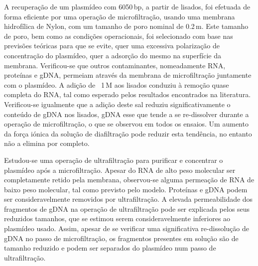 A recuperação de um plasmídeo com 6050\,bp, a partir de lisados, foi efetuada de forma eficiente por uma operação de microfiltração, usando uma membrana hidrofílica de Nylon, com um tamanho de poro nominal de 0.2\,\micro m. Este tamanho de poro, bem como as condições operacionais, foi selecionado com base nas previsões teóricas para que se evite, quer uma excessiva polarização de concentração do plasmídeo, quer a adsorção do mesmo na superfície da membrana. Verificou-se que outros contaminantes, nomeadamente RNA, proteínas e gDNA, permeiam através da membrana de microfiltração juntamente com o plasmídeo. A adição de \cacldois\ 1\,M aos lisados conduziu à remoção quase completa do RNA, tal como esperado pelos resultados encontrados na literatura. Verificou-se igualmente que a adição deste sal reduziu significativamente o conteúdo de gDNA nos lisados, gDNA esse que tende a se re-dissolver durante a operação de microfiltração, o que se observou em todos os ensaios. Um aumento da força iónica da solução de diafiltração pode reduzir esta tendência, no entanto não a elimina por completo.

Estudou-se uma operação de ultrafiltração para purificar e concentrar o plasmídeo após a microfiltração. Apesar do RNA de alto peso molecular ser completamente retido pela membrana, observou-se alguma permeação de RNA de baixo peso molecular, tal como previsto pelo modelo. Proteínas e gDNA podem ser consideravelmente removidos por ultrafiltração. A elevada permeabilidade dos fragmentos de gDNA na operação de ultrafiltração pode ser explicada pelos seus reduzidos tamanhos, que se estimou serem consideravelmente inferiores ao plasmídeo usado. Assim, apesar de se verificar uma significativa re-dissolução de gDNA no passo de microfiltração, os fragmentos presentes em solução são de tamanho reduzido e podem ser separados do plasmídeo num passo de ultrafiltração.
